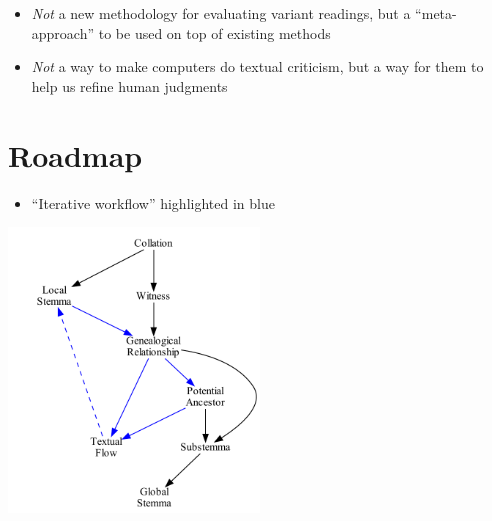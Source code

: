 \documentclass[10pt]{beamer}
\begin{document}
	\begin{frame}
		\begin{itemize}
			\item \emph{Not} a new methodology for evaluating variant readings, but a ``meta-approach'' to be used on top of existing methods			
			\item \emph{Not} a way to make computers do textual criticism, but a way for them to help us refine human judgments
		\end{itemize}
	\end{frame}
	\section*{Roadmap}
	\begin{frame}
		\begin{itemize}
			\item ``Iterative workflow'' highlighted in blue
		\end{itemize}
		\begin{center}
			\includegraphics[width=0.5\textwidth]{../img/roadmap.pdf}
		\end{center}
	\end{frame}
\end{document}
